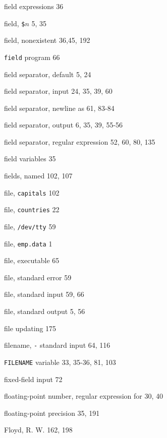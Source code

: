 \begin{multicols}{3}
\hangindent=3pc  field expressions 36

\hangindent=3pc  field, \verb'$'$n$ 5, 35

\hangindent=3pc  field, nonexistent 36,45, 192

\hangindent=3pc  \verb'field' program 66

\hangindent=3pc  field separator, default 5, 24

\hangindent=3pc  field separator, input 24, 35, 39, 60

\hangindent=3pc  field separator, newline as 61, 83-84

\hangindent=3pc  field separator, output 6, 35, 39, 55-56

\hangindent=3pc  field separator, regular expression 52, 60, 80, 135

\hangindent=3pc  field variables 35

\hangindent=3pc  fields, named 102, 107

\hangindent=3pc  file, \verb'capitals' 102

\hangindent=3pc  file, \verb'countries' 22

\hangindent=3pc  file, \verb'/dev/tty' 59

\hangindent=3pc  file, \verb'emp.data' 1

\hangindent=3pc  file, executable 65

\hangindent=3pc  file, standard error 59

\hangindent=3pc  file, standard input 59, 66

\hangindent=3pc  file, standard output 5, 56

\hangindent=3pc  file updating 175

\hangindent=3pc  filename, \verb'-' standard input 64, 116

\hangindent=3pc  \verb'FILENAME' variable 33, 35-36, 81, 103

\hangindent=3pc  fixed-field input 72

\hangindent=3pc  floating-point number, regular expression for 30, 40

\hangindent=3pc  floating-point precision 35, 191

\hangindent=3pc  Floyd, R. W. 162, 198


\end{multicols}
